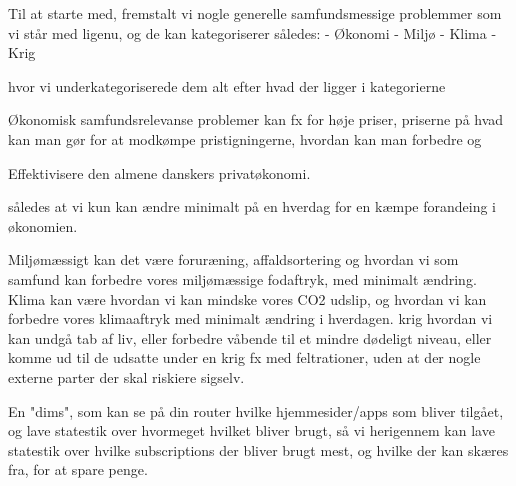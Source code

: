 Til at starte med, fremstalt vi nogle generelle samfundsmessige problemmer som vi står med ligenu, og de kan kategoriserer således:
- Økonomi
- Miljø
- Klima
- Krig

hvor vi underkategoriserede dem alt efter hvad der ligger i kategorierne

Økonomisk samfundsrelevanse problemer kan fx for høje priser, priserne på hvad kan man gør for at modkømpe pristigningerne, hvordan kan man forbedre og


Effektivisere den almene danskers privatøkonomi. 

således at vi kun kan ændre minimalt på en hverdag for en kæmpe forandeing i økonomien.


Miljømæssigt kan det være foruræning, affaldsortering og hvordan vi som samfund kan forbedre vores miljømæssige fodaftryk, med minimalt ændring.
Klima kan være hvordan vi kan mindske vores CO2 udslip, og hvordan vi kan forbedre vores klimaaftryk med minimalt ændring i hverdagen.
krig hvordan vi kan undgå tab af liv, eller forbedre våbende til et mindre dødeligt niveau, eller komme ud til de udsatte under en krig fx med feltrationer, uden at der nogle externe parter der skal riskiere sigselv.



En "dims", som kan se på din router hvilke hjemmesider/apps som bliver tilgået, og lave statestik over hvormeget hvilket bliver brugt, så vi herigennem kan lave statestik over hvilke subscriptions der bliver brugt mest, og hvilke der kan skæres fra, for at spare penge.
